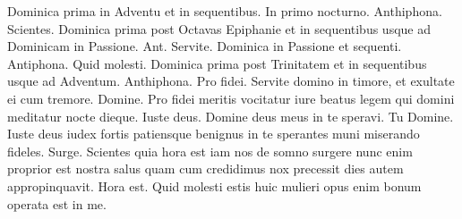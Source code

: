 \newpage


\thispagestyle{fancy}

\begin{multicols*}{2}


\noindent Dominica prima in Adventu et in sequentibus. In primo nocturno. Anthiphona.
 Scientes.
\newline Dominica prima post Octavas Epiphanie et in sequentibus usque ad Dominicam in Passione. Ant.
 Servite.
\newline Dominica in Passione et sequenti. Antiphona.
 Quid molesti.
\newline Dominica prima post Trinitatem et in sequentibus usque ad Adventum. Anthiphona.
 Pro fidei.
 Servite domino in timore, et exultate ei cum tremore.
 Domine.
 Pro fidei meritis vocitatur iure beatus legem qui domini meditatur nocte dieque.
 Iuste deus.
 Domine deus meus in te speravi.
 Tu Domine.
 Iuste deus iudex fortis patiensque benignus in te sperantes muni miserando fideles.
 Surge.
 Scientes quia hora est iam nos de somno surgere nunc enim proprior est nostra salus quam cum credidimus nox precessit dies autem appropinquavit.
 Hora est.
 Quid molesti estis huic mulieri opus enim bonum operata est in me.

\end{multicols*}
